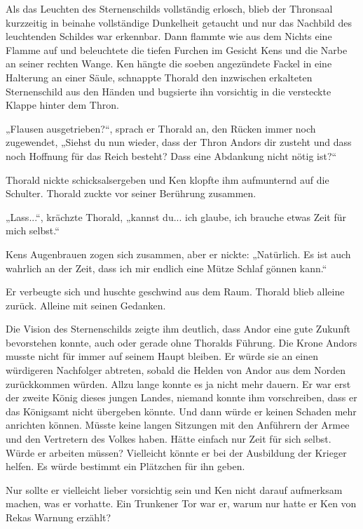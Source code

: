 Als das Leuchten des Sternenschilds vollständig erlosch, blieb der Thronsaal kurzzeitig in beinahe vollständige Dunkelheit getaucht und nur das Nachbild des leuchtenden Schildes war erkennbar. Dann flammte wie aus dem Nichts eine Flamme auf und beleuchtete die tiefen Furchen im Gesicht Kens und die Narbe an seiner rechten Wange. Ken hängte die soeben angezündete Fackel in eine Halterung an einer Säule, schnappte Thorald den inzwischen erkalteten Sternenschild aus den Händen und bugsierte ihn vorsichtig in die versteckte Klappe hinter dem Thron.

„Flausen ausgetrieben?“, sprach er Thorald an, den Rücken immer noch zugewendet, „Siehst du nun wieder, dass der Thron Andors dir zusteht und dass noch Hoffnung für das Reich besteht? Dass eine Abdankung nicht nötig ist?“

Thorald nickte schicksalsergeben und Ken klopfte ihm aufmunternd auf die Schulter. Thorald zuckte vor seiner Berührung zusammen.

„Lass...“, krächzte Thorald, „kannst du... ich glaube, ich brauche etwas Zeit für mich selbst.“

Kens Augenbrauen zogen sich zusammen, aber er nickte: „Natürlich. Es ist auch wahrlich an der Zeit, dass ich mir endlich eine Mütze Schlaf gönnen kann.“

Er verbeugte sich und huschte geschwind aus dem Raum. Thorald blieb alleine zurück. Alleine mit seinen Gedanken.

Die Vision des Sternenschilds zeigte ihm deutlich, dass Andor eine gute Zukunft bevorstehen konnte, auch oder gerade ohne Thoralds Führung. Die Krone Andors musste nicht für immer auf seinem Haupt bleiben. Er würde sie an einen würdigeren Nachfolger abtreten, sobald die Helden von Andor aus dem Norden zurückkommen würden. Allzu lange konnte es ja nicht mehr dauern. Er war erst der zweite König dieses jungen Landes, niemand konnte ihm vorschreiben, dass er das Königsamt nicht übergeben könnte. Und dann würde er keinen Schaden mehr anrichten können. Müsste keine langen Sitzungen mit den Anführern der Armee und den Vertretern des Volkes haben. Hätte einfach nur Zeit für sich selbst. Würde er arbeiten müssen? Vielleicht könnte er bei der Ausbildung der Krieger helfen. Es würde bestimmt ein Plätzchen für ihn geben.

Nur sollte er vielleicht lieber vorsichtig sein und Ken nicht darauf aufmerksam machen, was er vorhatte. Ein Trunkener Tor war er, warum nur hatte er Ken von Rekas Warnung erzählt?

